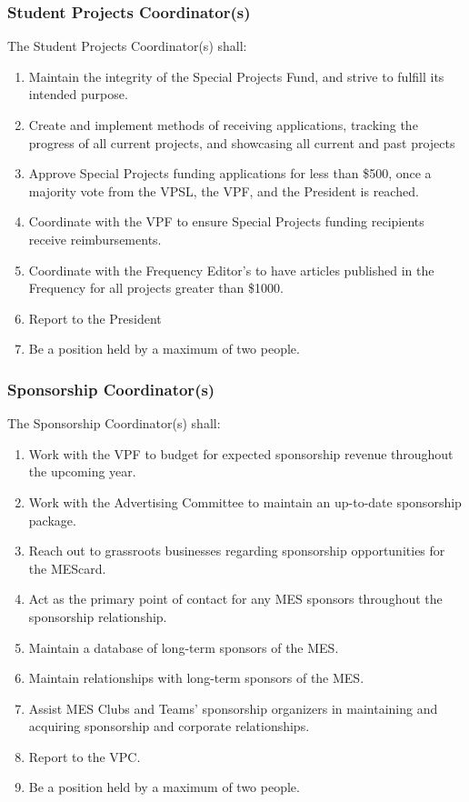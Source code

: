 \subsubsection{Student Projects Coordinator(s)}
\label{special-projects-coordinators}

The Student Projects Coordinator(s) shall:
\begin{enumerate}
 \item
  Maintain the integrity of the Special Projects Fund, and strive to fulfill its intended purpose.
 \item
  Create and implement methods of receiving applications, tracking the progress of all current projects, and showcasing all current and past projects
 \item
  Approve Special Projects funding applications for less than \$500, once a majority vote from the VPSL, the VPF, and the President is reached.
 \item
  Coordinate with the VPF to ensure Special Projects funding recipients receive reimbursements.
 \item
  Coordinate with the Frequency Editor's to have articles published in the Frequency for all projects greater than \$1000.
 \item
  Report to the President
 \item
  Be a position held by a maximum of two people.

\end{enumerate}

\subsubsection{Sponsorship Coordinator(s)}
\label{sponsorship-coordinators}
The Sponsorship Coordinator(s) shall:

\begin{enumerate}
 \item
  Work with the VPF to budget for expected sponsorship revenue throughout the upcoming year.
 \item
  Work with the Advertising Committee to maintain an up-to-date sponsorship package.
 \item
  Reach out to grassroots businesses regarding sponsorship opportunities for the MEScard.
 \item
  Act as the primary point of contact for any MES sponsors throughout the sponsorship relationship.
 \item
  Maintain a database of long-term sponsors of the MES.
 \item
  Maintain relationships with long-term sponsors of the MES.
 \item
  Assist MES Clubs and Teams' sponsorship organizers in maintaining and acquiring sponsorship and corporate relationships.
 \item
  Report to the VPC.
 \item
  Be a position held by a maximum of two people.
\end{enumerate}

